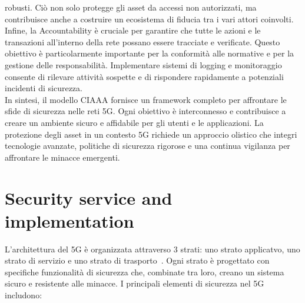 \documentclass[english]{article}
\begin{document}
robusti. Ciò non solo protegge gli asset da accessi non autorizzati, ma
contribuisce anche a costruire un ecosistema di fiducia tra i vari attori
coinvolti. \\ Infine, la Accountability è cruciale per garantire che tutte le
azioni e le transazioni all'interno della rete possano essere tracciate e
verificate. Questo obiettivo è particolarmente importante per la conformità
alle normative e per la gestione delle responsabilità. Implementare sistemi di
logging e monitoraggio consente di rilevare attività sospette e di rispondere
rapidamente a potenziali incidenti di sicurezza. \\ In sintesi, il modello
CIAAA fornisce un framework completo per affrontare le sfide di sicurezza nelle
reti 5G. Ogni obiettivo è interconnesso e contribuisce a creare un ambiente
sicuro e affidabile per gli utenti e le applicazioni. La protezione degli asset
in un contesto 5G richiede un approccio olistico che integri tecnologie
avanzate, politiche di sicurezza rigorose e una continua vigilanza per
affrontare le minacce emergenti.
\section{Security service and implementation}\label{sec:4}
L'architettura del 5G è organizzata attraverso 3 strati: uno strato applicatvo,
uno strato di servizio e uno strato di trasporto~\cite{Jover2018Security}. Ogni
strato è progettato con specifiche funzionalità di sicurezza che, combinate tra
loro, creano un sistema sicuro e resistente alle minacce. I principali elementi
di sicurezza nel 5G includono:
\end{document}
